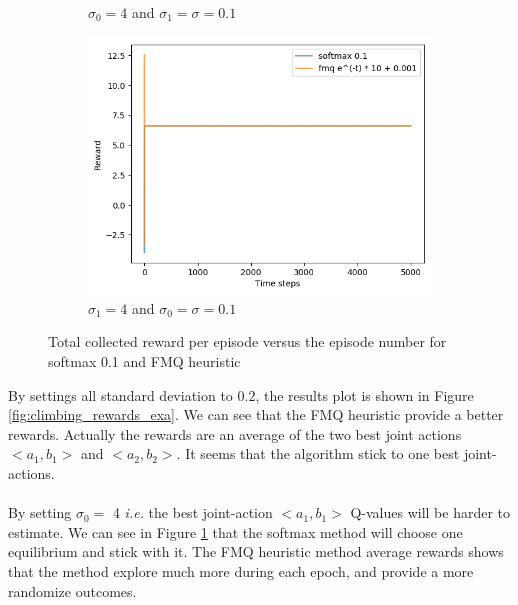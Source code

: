 \documentclass[letterpaper]{article}
\begin{document}
\begin{figure}[H]
\begin{subfigure}{.5\textwidth}
    \caption{$\sigma_0 = 4$ and $\sigma_1 = \sigma = 0.1$}
    \label{fig:climbing_rewards_exb}
  \end{subfigure}
  \begin{subfigure}{.5\textwidth}
    \centering
    \includegraphics[width=1\linewidth]{images/assign3/exc/rewards}
    \caption{$\sigma_1 = 4$ and $\sigma_0 = \sigma = 0.1$}
    \label{fig:climbing_rewards_exc}
  \end{subfigure}
    \caption{Total collected reward per episode
    versus the episode number for softmax 0.1 and FMQ heuristic}
    \label{fig:climbing_rewards}
\end{figure}


By settings all standard deviation to $0.2$, the results plot is shown
in Figure \ref{fig:climbing_rewards_exa}. We can see that the FMQ heuristic
provide a better rewards. Actually the rewards are an average of the two
best joint actions $<a_1, b_1>$ and $<a_2, b_2>$. It seems that the
algorithm stick to one best joint-actions.

\paragraph{}

By setting $\sigma_0 =$ 4 \textit{i.e.} the best joint-action  $<a_1, b_1>$
Q-values will be harder to estimate. We can see in Figure
\ref{fig:climbing_rewards_exb} that the softmax method will choose one
equilibrium and stick with it. The FMQ heuristic method average rewards
shows that the method explore much more during each epoch, and provide a
more randomize outcomes.
\end{document}

